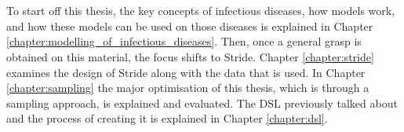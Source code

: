 \\\\
To start off this thesis, the key concepts of infectious diseases, how models work, and how these models can be used on those diseases is explained in Chapter \ref{chapter:modelling_of_infectious_diseases}. Then, once a general grasp is obtained on this material, the focus shifts to Stride. Chapter \ref{chapter:stride} examines the design of Stride along with the data that is used. In Chapter \ref{chapter:sampling} the major optimisation of this thesis, which is through a sampling approach, is explained and evaluated. The DSL previously talked about and the process of creating it is explained in Chapter \ref{chapter:dsl}.
